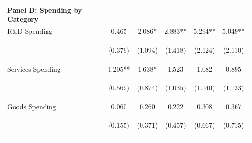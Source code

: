 \documentclass[dv_diss_main.tex]{subfiles}
\begin{document}
\begin{table}[H]
\begin{center}
{\begin{tabular}{lccccc}
    \multicolumn{1}{l}{\textbf{Panel D: Spending by Category}} \\ 
    R\&D Spending & 0.465 & 2.086* & 2.883** & 5.294** & 5.049** \\
    \vspace{4pt} & \begin{footnotesize}(0.379)\end{footnotesize} & \begin{footnotesize}(1.094)\end{footnotesize} & \begin{footnotesize}(1.418)\end{footnotesize} & \begin{footnotesize}(2.124)\end{footnotesize} & \begin{footnotesize}(2.110)\end{footnotesize} \\
    Services Spending & 1.205** & 1.638* & 1.523 & 1.082 & 0.895 \\
    \vspace{4pt} & \begin{footnotesize}(0.569)\end{footnotesize} & \begin{footnotesize}(0.874)\end{footnotesize} & \begin{footnotesize}(1.035)\end{footnotesize} & \begin{footnotesize}(1.140)\end{footnotesize} & \begin{footnotesize}(1.133)\end{footnotesize} \\
    Goods Spending & 0.060 & 0.260 & 0.222 & 0.308 & 0.367 \\
     & \begin{footnotesize}(0.155)\end{footnotesize} & \begin{footnotesize}(0.371)\end{footnotesize} & \begin{footnotesize}(0.457)\end{footnotesize} & \begin{footnotesize}(0.667)\end{footnotesize} & \begin{footnotesize}(0.715)\end{footnotesize} \\



\end{tabular}}
\end{center}
\end{table}
\end{document}
